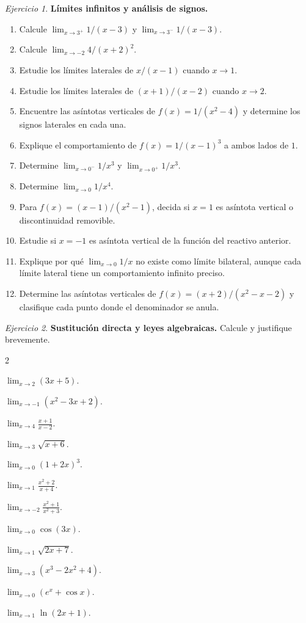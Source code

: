 \documentclass[12pt]{article}
\theoremstyle{remark}
\newtheorem{Ejer}{Ejercicio}
\begin{document}
\begin{Ejer}\textbf{Límites infinitos y análisis de signos.}
\begin{enumerate}[resume=banco]
\item Calcule $\lim_{x\to3^+}1/(x-3)$ y $\lim_{x\to3^-}1/(x-3)$.
\item Calcule $\lim_{x\to-2}4/(x+2)^2$.
\item Estudie los límites laterales de $x/(x-1)$ cuando $x\to1$.
\item Estudie los límites laterales de $(x+1)/(x-2)$ cuando $x\to2$.
\item Encuentre las asíntotas verticales de $f(x)=1/(x^2-4)$ y determine los signos laterales en cada una.
\item Explique el comportamiento de $f(x)=1/(x-1)^3$ a ambos lados de $1$.
\item Determine $\lim_{x\to0^-}1/x^3$ y $\lim_{x\to0^+}1/x^3$.
\item Determine $\lim_{x\to0}1/x^4$.
\item Para $f(x)=(x-1)/(x^2-1)$, decida si $x=1$ es asíntota vertical o discontinuidad removible.
\item Estudie si $x=-1$ es asíntota vertical de la función del reactivo anterior.
\item Explique por qué $\lim_{x\to0}1/x$ no existe como límite bilateral, aunque cada límite lateral tiene un comportamiento infinito preciso.
\item Determine las asíntotas verticales de $f(x)=(x+2)/(x^2-x-2)$ y clasifique cada punto donde el denominador se anula.
\end{enumerate}
\end{Ejer}

\begin{Ejer}\textbf{Sustitución directa y leyes algebraicas.} Calcule y justifique brevemente.
\begin{enumerate}[resume=banco]
\begin{multicols}{2}
\item $\displaystyle\lim_{x\to2}(3x+5)$.
\item $\displaystyle\lim_{x\to-1}(x^2-3x+2)$.
\item $\displaystyle\lim_{x\to4}\frac{x+1}{x-2}$.
\item $\displaystyle\lim_{x\to3}\sqrt{x+6}$.
\item $\displaystyle\lim_{x\to0}(1+2x)^3$.
\item $\displaystyle\lim_{x\to1}\frac{x^2+2}{x+4}$.
\item $\displaystyle\lim_{x\to-2}\frac{x^2+1}{x^2+3}$.
\item $\displaystyle\lim_{x\to0}\cos(3x)$.
\item $\displaystyle\lim_{x\to1}\sqrt{2x+7}$.
\item $\displaystyle\lim_{x\to3}(x^3-2x^2+4)$.
\item $\displaystyle\lim_{x\to0}(e^x+\cos x)$.
\item $\displaystyle\lim_{x\to1}\ln(2x+1)$.
\end{multicols}
\end{enumerate}
\end{Ejer}
\end{document}
